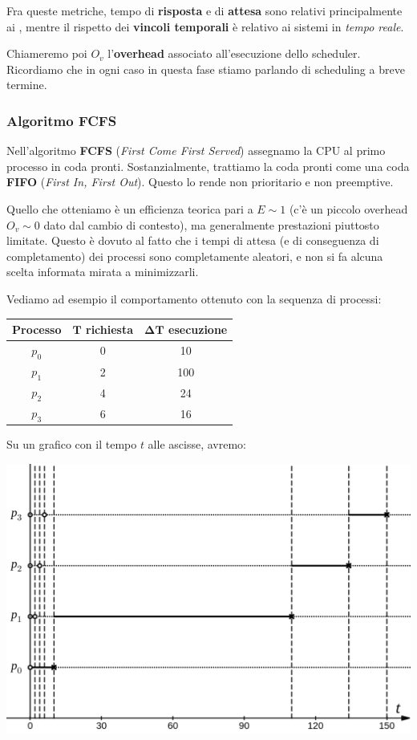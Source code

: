 \documentclass[a4paper,11pt]{article}
\begin{document}
Fra queste metriche, tempo di \textbf{risposta} e di \textbf{attesa} sono relativi principalmente ai , mentre il rispetto dei \textbf{vincoli temporali} è relativo ai sistemi in \textit{tempo reale}.

Chiameremo poi $O_v$ l'\textbf{overhead} associato all'esecuzione dello scheduler. Ricordiamo che in ogni caso in questa fase stiamo parlando di scheduling a breve termine.

\subsubsection{Algoritmo FCFS}
Nell'algoritmo \textbf{FCFS} (\textit{First Come First Served}) assegnamo la CPU al primo processo in coda pronti. Sostanzialmente, trattiamo la coda pronti come una coda \textbf{FIFO} (\textit{First In, First Out}).
Questo lo rende non prioritario e non preemptive.

Quello che otteniamo è un efficienza teorica pari a $E\sim1$ (c'è un piccolo overhead $O_v \sim 0$ dato dal cambio di contesto), ma generalmente prestazioni piuttosto limitate.
Questo è dovuto al fatto che i tempi di attesa (e di conseguenza di completamento) dei processi sono completamente aleatori, e non si fa alcuna scelta informata mirata a minimizzarli.

\newpage

Vediamo ad esempio il comportamento ottenuto con la sequenza di processi:
\begin{table}[H]
	\center {}
	\begin{tabular} { c || c | c }
		\bfseries Processo & \bfseries $\mathbf{T}$ richiesta & \bfseries $\mathbf{\Delta T}$ esecuzione \\
		\hline
		$p_0$ & 0 & 10 \\ 
		$p_1$ & 2 & 100 \\ 
		$p_2$ & 4 & 24 \\ 
		$p_3$ & 6 & 16 
	\end{tabular}
\end{table}

Su un grafico con il tempo $t$ alle ascisse, avremo:
\begin{center}
	\includegraphics[scale=0.3]{../figures/fcfs_bad.png}
\end{center}
\end{document}
